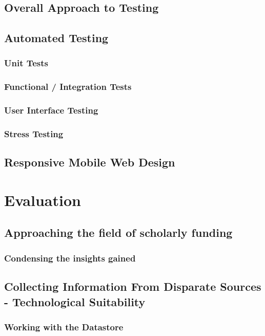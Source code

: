 \section{Overall Approach to Testing}
\section{Automated Testing}
\subsection{Unit Tests}
\subsection{Functional / Integration Tests}
\subsection{User Interface Testing}
\subsection{Stress Testing}
\section{Responsive Mobile Web Design}
\chapter{Evaluation}
\section{Approaching the field of scholarly funding}
\subsection{Condensing the insights gained}
\section{Collecting Information From Disparate Sources - Technological Suitability}
\subsection{Working with the Datastore}
